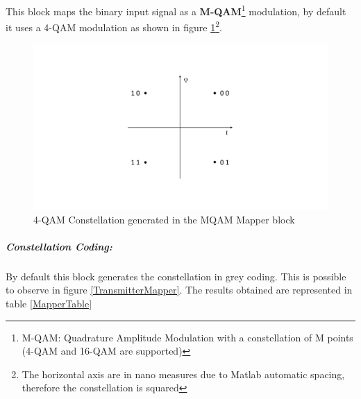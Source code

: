 This block maps the binary input signal as a \textbf{M-QAM}\footnote{M-QAM: Quadrature Amplitude Modulation with a constellation of M points (4-QAM and 16-QAM are supported)} modulation, by default it uses a 4-QAM modulation as shown in figure \ref{TransmitterConstellation}\footnote{The horizontal axis are in nano measures due to Matlab automatic spacing, therefore the constellation is squared}.

\begin{figure}[h]
	\centering
    \includegraphics[width=\textwidth]{./lib/m_qam_transmitter/figures/MQAM_constellation.pdf}
    \caption{4-QAM Constellation generated in the MQAM Mapper block}\label{TransmitterConstellation}
\end{figure}

\subparagraph*{Constellation Coding:}

By default this block generates the constellation in grey coding. This is possible to observe in figure \ref{TransmitterMapper}. The results obtained are represented in table \ref{MapperTable}

